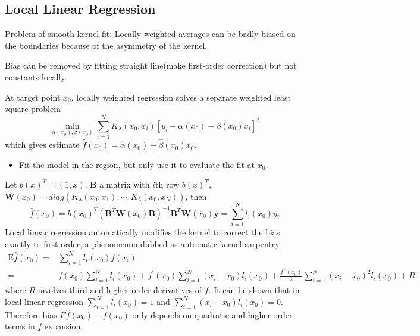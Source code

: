 \subsection{Local Linear Regression}
Problem of smooth kernel fit: Locally-weighted averages can be badly biased on the boundaries 
because of the asymmetry of the kernel. 

Bias can be removed by fitting straight line(make first-order correction) but not constants 
locally. 

At target point $x_0$, locally weighted regression solves a separate weighted least square 
problem
\begin{equation*}
\min _{\alpha\left(x_{0}\right), \beta\left(x_{0}\right)} \sum_{i=1}^{N} K_{\lambda}
\left(x_{0}, x_{i}\right)\left[y_{i}-\alpha\left(x_{0}\right)-\beta\left(x_{0}\right) 
x_{i}\right]^{2}
\end{equation*}
which gives estimate $ \hat{f}\left(x_{0}\right)=\hat{\alpha}\left(x_{0}\right)
+\hat{\beta}\left(x_{0}\right) x_{0} $. 
\begin{itemize}
\item Fit the model in the region, but only use it to evaluate the fit at $x_0$. 
\end{itemize}

Let $b(x)^T=(1,x)$, $\mathbf{B}$ a matrix with $i$th row $b(x)^T$, 
$\mathbf{W}(x_0)=diag(K_\lambda(x_0,x_1),\cdots,K_\lambda(x_0,x_N))$, then
\begin{equation*}
\hat{f}\left(x_{0}\right)=b\left(x_{0}\right)^{T}\left(\mathbf{B}^{T} 
\mathbf{W}\left(x_{0}\right)\mathbf{B}\right)^{-1}\mathbf{B}^{T}\mathbf{W}\left(x_{0}\right) 
\mathbf{y}=\sum_{i=1}^{N} l_{i}\left(x_{0}\right) y_{i}
\end{equation*}
Local linear regression automatically modifies the kernel to correct the bias exactly to
first order, a phenomenon dubbed as automatic kernel carpentry.
\begin{align*}
\mathrm{E} \hat{f}\left(x_{0}\right)=& 
\sum_{i=1}^{N} l_{i}\left(x_{0}\right) f\left(x_{i}\right) \\
=& f\left(x_{0}\right) \sum_{i=1}^{N} l_{i}\left(x_{0}\right)+f^{\prime}\left(x_{0}\right)
\sum_{i=1}^{N}\left(x_{i}-x_{0}\right) l_{i}\left(x_{0}\right)+\frac{f^{\prime \prime}
\left(x_{0}\right)}{2} \sum_{i=1}^{N}\left(x_{i}-x_{0}\right)^{2} l_{i}\left(x_{0}\right)
+R
\end{align*}
where $R$ involves third and higher order derivatives of $f$. 
It can be shown that in local linear regression $\sum_{i=1}^{N} l_{i}\left(x_{0}\right)=1$
and $\sum_{i=1}^{N}\left(x_{i}-x_{0}\right) l_{i}\left(x_{0}\right)=0$. Therefore bias
$E\hat{f}(x_0)-f(x_0)$ only depends on quadratic and higher order terms in $f$ expansion. 


